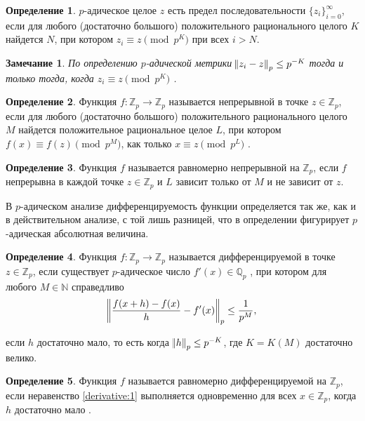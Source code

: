 \documentclass[master, och, diploma, times]{sty/SCWorks}
\theoremstyle{plain}
\newtheorem{note}{Замечание}[section]
\theoremstyle{definition}
\newtheorem{defn}{Определение}[section]
\numberwithin{equation}{section}
\begin{document}
\begin{defn}
$p$-адическое целое $z$ есть предел последовательности $\{z_i\}^{\infty}_{i=0}$, если для любого (достаточно большого) положительного рационального целого $K$ найдется $N$, при котором ${z_i \equiv z \pmod p^K}$ при всех $i>N$\cite{bib:analysis:anashin}.
\end{defn}

\begin{note}
По определению $p$-адической метрики $\norm{z_i-z}_p \le p^{-K}$ тогда и только тогда, когда $z_i \equiv z \pmod p^K$ \cite{bib:analisys:khrennikov:1}.
\end{note}

\begin{defn}
Функция $f:\mathbb {Z}_p \rightarrow \mathbb {Z}_p$ называется непрерывной в точке $z \in \mathbb {Z}_p$, если для любого (достаточно большого) положительного рационального целого $M$ найдется положительное рациональное целое $L$, при котором ${f(x) \equiv f(z) \pmod p^M}$, как только $x \equiv z \pmod{p^L}$ \cite{bib:analysis:anashin:2}.
\end{defn}

\begin{defn}
Функция $f$ называется равномерно непрерывной на $\mathbb {Z}_p$, если $f$ непрерывна в каждой точке $z \in \mathbb {Z}_p$ и $L$ зависит только от $M$ и не зависит от $z$\cite{bib:analysis:ciocan}.
\end{defn}

В $p$-адическом анализе дифференцируемость функции определяется так же, как и в действительном анализе, с той лишь разницей, что в определении фигурирует $p$-адическая абсолютная величина.

\begin{defn}
Функция $f:\mathbb {Z}_p \rightarrow \mathbb {Z}_p$ называется дифференцируемой в точке $z \in \mathbb {Z}_p$, если существует $p$-адическое число $f'(x) \in \mathbb {Q}_p$ , при котором для любого $M \in \mathbb {N}$ справедливо
\begin{equation} \label{derivative:1}
	\norm{\frac{f(x+h)-f(x)}{h} - f'(x)}_p \le \frac{1}{p^M},
\end{equation}

\noindent если $h$ достаточно мало, то есть когда $\norm{h}_p \le p^{-K}$, где $K=K(M)$ достаточно велико.
\end{defn}

\begin{defn}
Функция $f$ называется равномерно дифференцируемой на $\mathbb {Z}_p$, если неравенство \eqref{derivative:1} выполняется одновременно для всех $x \in \mathbb {Z}_p$, когда $h$ достаточно мало \cite{bib:analysis:anashin:en}.
\end{defn}
\end{document}
